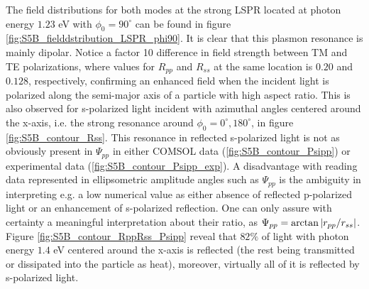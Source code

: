 The field distributions for both modes at the strong LSPR located at photon energy $1.23$ eV with $\phi_0=90^\circ$ can be found in figure \ref{fig:S5B_fielddstribution_LSPR_phi90}. It is clear that this plasmon resonance is mainly dipolar. Notice a factor 10 difference in field strength between TM and TE polarizations, where values for $R_{pp}$ and $R_{ss}$ at the same location is $0.20$ and $0.128$, respectively, confirming an enhanced field when the incident light is polarized along the semi-major axis of a particle with high aspect ratio. This is also observed for s-polarized light incident with azimuthal angles centered around the x-axis, i.e. the strong resonance around $\phi_0=0^\circ, 180^\circ$, in figure \ref{fig:S5B_contour_Rss}. This resonance in reflected s-polarized light is not as obviously present in $\Psi_{pp}$ in either COMSOL data (\ref{fig:S5B_contour_Psipp}) or experimental data (\ref{fig:S5B_contour_Psipp_exp}). A disadvantage with reading data represented in ellipsometric amplitude angles such as $\Psi_{pp}$ is the ambiguity in interpreting e.g. a low numerical value as either absence of reflected p-polarized light or an enhancement of s-polarized reflection. One can only assure with certainty a meaningful interpretation about their ratio, as $\Psi_{pp}=\arctan\left| r_{pp}/r_{ss} \right|$. Figure \ref{fig:S5B_contour_RppRss_Psipp} reveal that $82\%$ of light with photon energy $1.4$ eV centered around the x-axis is reflected (the rest being transmitted or dissipated into the particle as heat), moreover, virtually all of it is reflected by s-polarized light.


